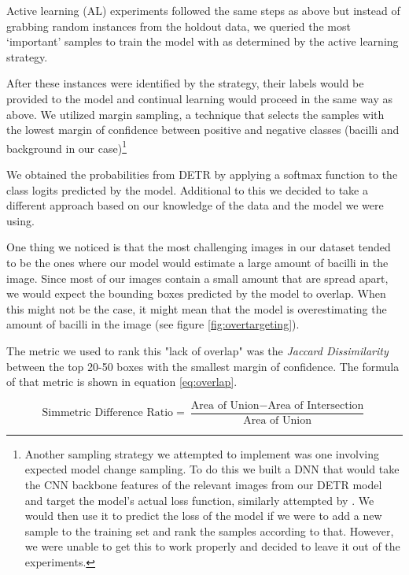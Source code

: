 \documentclass[../main.tex]{subfiles}
\begin{document}
    
    Active learning (AL) experiments followed the same steps as above but instead of grabbing random instances from the holdout data, we queried the most `important' samples to train the model with as determined by the active learning strategy.
    
    After these instances were identified by the strategy, their labels would be provided to the model and continual learning would proceed in the same way as above. We utilized margin sampling, a technique that selects the samples with the lowest margin of confidence between positive and negative classes (bacilli and background in our case)\footnote{
        Another sampling strategy we attempted to implement was one involving expected model change sampling. To do this we built a DNN that would take the CNN backbone features of the relevant images from our DETR model and target the model's actual loss function, similarly attempted by  \cite{yooLearningLossActive2019}. We would then use it to predict the loss of the model if we were to add a new sample to the training set and rank the samples according to that. However, we were unable to get this to work properly and decided to leave it out of the experiments.
    }

    We obtained the probabilities from DETR by applying a softmax function to the class logits predicted by the model. Additional to this we decided to take a different approach based on our knowledge of the data and the model we were using. 

    One thing we noticed is that the most challenging images in our dataset tended to be the ones where our model would estimate a large amount of bacilli in the image. Since most of our images contain a small amount that are spread apart, we would expect the bounding boxes predicted by the model to overlap. When this might not be the case, it might mean that the model is overestimating the amount of bacilli in the image (see figure \ref{fig:overtargeting}).

    The metric we used to rank this "lack of overlap" was the \textit{Jaccard Dissimilarity} between the top 20-50 boxes with the smallest margin of confidence. The formula of that metric is shown in equation \ref{eq:overlap}.

    \begin{equation}
        \text{Simmetric Difference Ratio} = \frac{\text{Area of Union} - \text{Area of Intersection}}{\text{Area of Union}}
        \label{eq:overlap}
    \end{equation}
\end{document}
